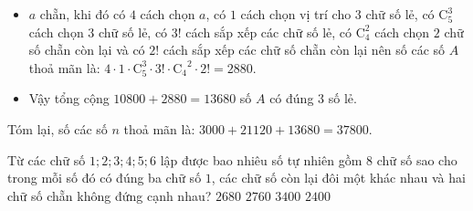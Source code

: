\begin{bt}
{\begin{itemize}
			\item $a$ chẵn, khi đó có $4$ cách chọn $a$, có $1$ cách chọn vị trí cho $3$ chữ số lẻ, có $\mathrm{C}_5^3$ cách chọn $3$ chữ số lẻ, có $3!$ cách sắp xếp các chữ số lẻ, có $\mathrm{C}_4^2$ cách chọn $2$ chữ số chẵn còn lại và có $2!$ cách sắp xếp các chữ số chẵn còn lại nên số các số $A$ thoả mãn là: $4\cdot 1\cdot \mathrm{C}_5^3\cdot 3!\cdot \mathrm{C_4}^2\cdot 2!=2880$.
			\item[] Vậy tổng cộng $10800+2880=13680$ số $A$ có đúng $3$ số lẻ.
		\end{itemize}
		Tóm lại, số các số $n$ thoả mãn là: $3000+21120+13680=37800$.
	}
\end{bt}

\begin{bt}%
	Từ các chữ số $1;2;3;4;5;6$ lập được bao nhiêu số tự nhiên gồm $8$ chữ số sao cho trong mỗi số đó có đúng ba chữ số $1$, các chữ số còn lại đôi một khác nhau và hai chữ số chẵn không đứng cạnh nhau?
	\choice
	{$2680$}
	{$2760$}
	{$3400$}
	{\True $2400$}
\end{bt}


